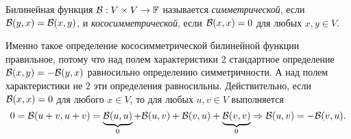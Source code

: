 \begin{definition}
    Билинейная функция $\mathcal{B}: V \times V \to \mathbb{F}$ называется \textit{симметрической}, если $\mathcal{B}(y, x) = \mathcal{B}(x, y)$, и \textit{кососимметрической}, если $\mathcal{B}(x, x) = 0$ для любых $x, y \in V$.
\end{definition}

\begin{remark}
    Именно такое определение кососимметрической билинейной функции правильное, потому что над полем характеристики $2$ стандартное определение $\mathcal{B}(x, y) = -\mathcal{B}(y, x)$ равносильно определению симметричности. А над полем характеристики не $2$ эти определения равносильны. Действительно, если $\mathcal{B}(x, x) = 0$ для любого $x \in V$, то для любых $u, v \in V$ выполняется
    \[
        0 = \mathcal{B}(u + v, u + v) = \underbrace{\mathcal{B}(u, u)}_{0} + \mathcal{B}(u, v) + \mathcal{B}(v, u) + \underbrace{\mathcal{B}(v, v)}_{0} \Rightarrow \mathcal{B}(u, v) = -\mathcal{B}(v, u).
    \]
\end{remark}

